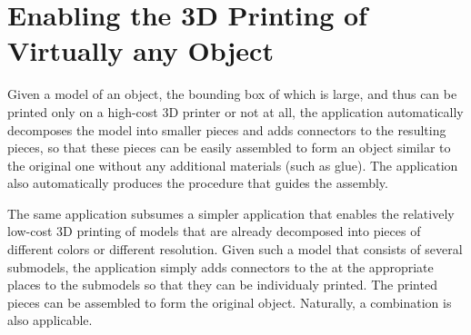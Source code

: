 \documentclass[11pt]{article}
\begin{document}
\section{Enabling the 3D Printing of Virtually any Object}
\label{sec:3d-printing}
Given a model of an object, the bounding box of which is
large, and thus can be printed only on a high-cost 3D printer or not
at all, the application automatically decomposes the model into smaller
pieces and adds connectors to the resulting pieces, so that these
pieces can be easily assembled to form an object similar to the
original one without any additional materials (such as glue). The
application also automatically produces the procedure that guides the
assembly.

The same application subsumes a simpler application that enables the
relatively low-cost 3D printing of models that are already decomposed
into pieces of different colors or different resolution. Given such a
model that consists of several submodels, the application simply adds
connectors to the at the appropriate places to the submodels so that
they can be individualy printed. The printed pieces can be assembled
to form the original object. Naturally, a combination is also
applicable.

\end{document}
